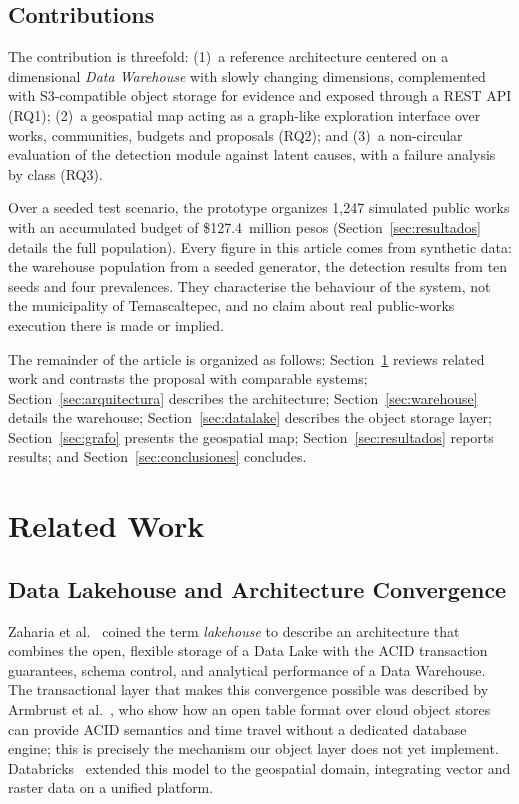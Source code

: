 \documentclass[runningheads]{llncs}
\renewcommand{\_}{\origunderscore\allowbreak}
\begin{document}
\subsection*{Contributions}

The contribution is threefold: (1)~a reference architecture centered on a dimensional \emph{Data Warehouse} with slowly changing dimensions, complemented with S3-compatible object storage for evidence and exposed through a REST API (RQ1); (2)~a geospatial map acting as a graph-like exploration interface over works, communities, budgets and proposals (RQ2); and (3)~a non-circular evaluation of the detection module against latent causes, with a failure analysis by class (RQ3).

Over a seeded test scenario, the prototype organizes 1,247 simulated public works with an accumulated budget of \$127.4~million pesos (Section~\ref{sec:resultados} details the full population). Every figure in this article comes from synthetic data: the warehouse population from a seeded generator, the detection results from ten seeds and four prevalences. They characterise the behaviour of the system, not the municipality of Temascaltepec, and no claim about real public-works execution there is made or implied.

The remainder of the article is organized as follows: Section~\ref{sec:trabajo-relacionado} reviews related work and contrasts the proposal with comparable systems; Section~\ref{sec:arquitectura} describes the architecture; Section~\ref{sec:warehouse} details the warehouse; Section~\ref{sec:datalake} describes the object storage layer; Section~\ref{sec:grafo} presents the geospatial map; Section~\ref{sec:resultados} reports results; and Section~\ref{sec:conclusiones} concludes.

\section{Related Work}
\label{sec:trabajo-relacionado}

\subsection{Data Lakehouse and Architecture Convergence}

Zaharia et al.~\cite{Zaharia2021} coined the term \textit{lakehouse} to describe an architecture that combines the open, flexible storage of a Data Lake with the ACID transaction guarantees, schema control, and analytical performance of a Data Warehouse. The transactional layer that makes this convergence possible was described by Armbrust et al.~\cite{Armbrust2020}, who show how an open table format over cloud object stores can provide ACID semantics and time travel without a dedicated database engine; this is precisely the mechanism our object layer does not yet implement. Databricks~\cite{Palkar2021} extended this model to the geospatial domain, integrating vector and raster data on a unified platform.
\end{document}
